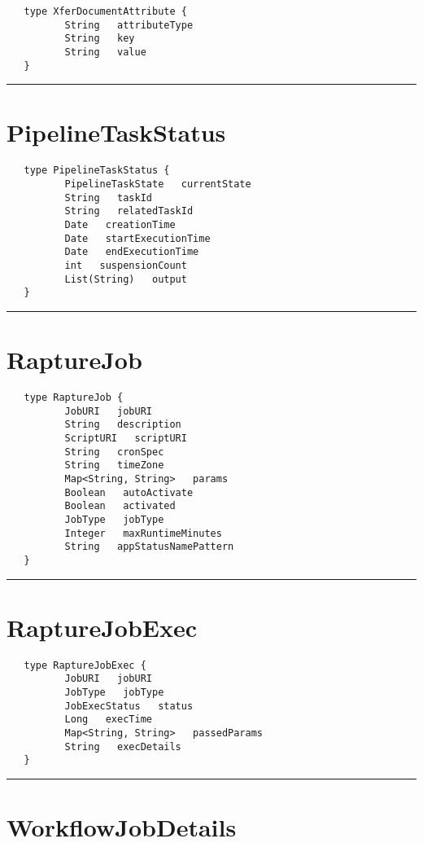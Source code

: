 \begin{verbatim}
   type XferDocumentAttribute {
          String   attributeType
          String   key
          String   value
   }
\end{verbatim}

\rule{12cm}{2pt}
\section{PipelineTaskStatus}
\label{type:PipelineTaskStatus}

\begin{verbatim}
   type PipelineTaskStatus {
          PipelineTaskState   currentState
          String   taskId
          String   relatedTaskId
          Date   creationTime
          Date   startExecutionTime
          Date   endExecutionTime
          int   suspensionCount
          List(String)   output
   }
\end{verbatim}

\rule{12cm}{2pt}
\section{RaptureJob}
\label{type:RaptureJob}

\begin{verbatim}
   type RaptureJob {
          JobURI   jobURI
          String   description
          ScriptURI   scriptURI
          String   cronSpec
          String   timeZone
          Map<String, String>   params
          Boolean   autoActivate
          Boolean   activated
          JobType   jobType
          Integer   maxRuntimeMinutes
          String   appStatusNamePattern
   }
\end{verbatim}

\rule{12cm}{2pt}
\section{RaptureJobExec}
\label{type:RaptureJobExec}

\begin{verbatim}
   type RaptureJobExec {
          JobURI   jobURI
          JobType   jobType
          JobExecStatus   status
          Long   execTime
          Map<String, String>   passedParams
          String   execDetails
   }
\end{verbatim}

\rule{12cm}{2pt}
\section{WorkflowJobDetails}
\label{type:WorkflowJobDetails}

